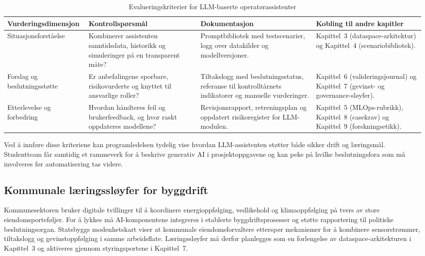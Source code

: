 \begin{table}[htbp]
    \centering
    \caption{Evalueringskriterier for LLM-baserte operatørassistenter}
    \label{tab:llm-assistent-evaluering}
    \begin{tabular}{p{3.6cm}p{4.5cm}p{4.0cm}p{3.8cm}}
        \toprule
        \textbf{Vurderingsdimensjon} & \textbf{Kontrollspørsmål} & \textbf{Dokumentasjon} & \textbf{Kobling til andre kapitler} \\
        \midrule
        Situasjonsforståelse & Kombinerer assistenten sanntidsdata, historikk og simuleringer på en transparent måte? & Promptbibliotek med testscenarier, logg over datakilder og modellversjoner. & Kapittel~3 (dataspace-arkitektur) og Kapittel~4 (scenariobibliotek). \\
        \addlinespace
        Forslag og beslutningsstøtte & Er anbefalingene sporbare, risikovurderte og knyttet til ansvarlige roller? & Tiltakslogg med beslutningsstatus, referanse til kontrolltårnets indikatorer og manuelle vurderinger. & Kapittel~6 (valideringsjournal) og Kapittel~7 (gevinst- og governance-sløyfer). \\
        \addlinespace
        Etterlevelse og forbedring & Hvordan håndteres feil og brukerfeedback, og hvor raskt oppdateres modellene? & Revisjonsrapport, retreningsplan og oppdatert risikoregister for LLM-modulen. & Kapittel~5 (MLOps-rubrikk), Kapittel~8 (casekrav) og Kapittel~9 (forskningsetikk). \\
        \bottomrule
    \end{tabular}
\end{table}

Ved å innføre disse kriteriene kan programledelsen tydelig vise hvordan LLM-assistenten støtter både sikker drift og læringsmål. Studentteam får samtidig et rammeverk for å beskrive generativ AI i prosjektoppgavene og kan peke på hvilke beslutningsfora som må involveres før automatisering tas videre.

\subsection{Kommunale læringssløyfer for byggdrift}
Kommunesektoren bruker digitale tvillinger til å koordinere energioppfølging, vedlikehold og klimaoppfølging på tvers av store eiendomsporteføljer.\citep{ks2024eiendomsdrift} For å lykkes må AI-komponentene integreres i etablerte byggdriftsprosesser og støtte rapportering til politiske beslutningsorgan. Statsbyggs modenhetskart viser at kommunale eiendomsforvaltere etterspør mekanismer for å kombinere sensorstrømmer, tiltakslogg og gevinstoppfølging i samme arbeidsflate.\citep{statsbygg2023digitalmodenhet} Læringssløyfer må derfor planlegges som en forlengelse av dataspace-arkitekturen i Kapittel~3 og aktiveres gjennom styringsportene i Kapittel~7.

